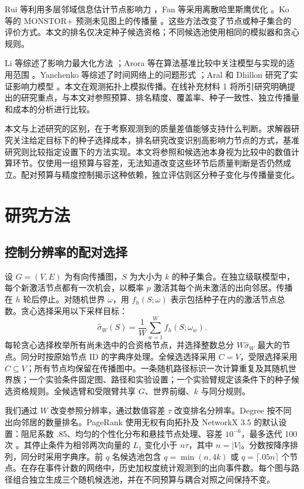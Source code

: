 \documentclass[smallextended]{svjour3}
\begin{document}
Rui 等利用多层邻域信息估计节点影响力 \cite{ref12}，Fan 等采用离散哈里斯鹰优化 \cite{ref13}。Ko 等的 MONSTOR+ 预测未见图上的传播量 \cite{ref19}。这些方法改变了节点或种子集合的评价方式。本文的排名仅决定种子候选资格；不同候选池使用相同的模拟器和贪心规则。

Li 等综述了影响力最大化方法 \cite{ref9}；Arora 等在算法基准比较中关注模型与实现的适用范围 \cite{ref16}。Yanchenko 等综述了时间网络上的问题形式 \cite{ref11}；Aral 和 Dhillon 研究了实证影响力模型 \cite{ref15}。本文在观测拓扑上模拟传播。在线补充材料 1 将所引研究明确提出的研究重点，与本文对参照预算、排名精度、覆盖率、种子一致性、独立传播量和成本的分析进行比较。

本文与上述研究的区别，在于考察观测到的质量差值能够支持什么判断。求解器研究关注给定目标下的种子选择成本，排名研究改变识别高影响力节点的方式，基准研究则比较指定设置下的方法实现。本文将参照和候选池本身视为比较中的数值计算环节。仅使用一组预算与容差，无法知道改变这些环节后质量判断是否仍然成立。配对预算与精度控制揭示这种依赖，独立评估则区分种子变化与传播量变化。

\section{研究方法}
\subsection{控制分辨率的配对选择}
设 $G=(V,E)$ 为有向传播图，$S$ 为大小为 $k$ 的种子集合。在独立级联模型中，每个新激活节点都有一次机会，以概率 $p$ 激活其每个尚未激活的出向邻居。传播在 $h$ 轮后停止。对随机世界 $\omega$，用 $f_h(S;\omega)$ 表示包括种子在内的激活节点总数。贪心选择采用以下采样目标：
\begin{equation}
\widehat\sigma_W(S)=\frac{1}{W}\sum_{w=1}^{W}f_h(S;\omega_w).
\end{equation}
每轮贪心选择枚举所有尚未选中的合资格节点，并选择整数总分 $W\widehat\sigma_W$ 最大的节点。同分时按原始节点 ID 的字典序处理。全候选选择采用 $C=V$，受限选择采用 $C\subseteq V$；所有节点均保留在传播图中。一条随机路径标识一次计算重复及其随机世界族；一个实验条件固定图、路径和实验设置；一个实验臂规定该条件下的种子候选资格规则。全候选臂和受限臂共享 $G$、世界前缀、$k$ 与同分规则。

我们通过 $W$ 改变参照分辨率，通过数值容差 $\tau$ 改变排名分辨率。Degree 按不同出向邻居的数量排名。PageRank 使用无权有向拓扑及 NetworkX 3.5 的默认设置：阻尼系数 .85、均匀的个性化分布和悬挂节点处理、容差 $10^{-6}$，最多迭代 100 次 \cite{networkxpr}。其停止条件为相邻两次向量的 $L_1$ 变化小于 $n\tau$，其中 $n=|V|$。分数按降序排列，同分时采用字典序。前 $q$ 名候选池包含 $q=\min(n,4k)$ 或 $q=\lceil .05n\rceil$ 个节点。在存在事件计数的网络中，历史加权度统计观测到的出向事件数。每个图与路径组合独立生成三个随机候选池，并在不同预算与耦合对照之间保持不变。
\end{document}
